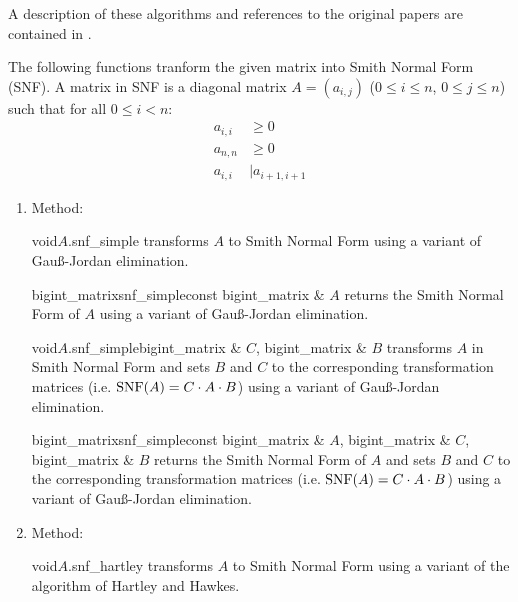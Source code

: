 {A description of these algorithms and references to the original papers are
contained in \cite{Theobald:2000}.



The following functions tranform the given matrix into Smith Normal Form (SNF).  A matrix in SNF
is a diagonal matrix $A = (a_{i,j})$ ($0 \leq i \leq n$, $0 \leq j \leq n$) such that for all $0
\leq i < n$:
\begin{align*}
  a_{i,i} & \geq 0 \\
  a_{n,n} & \geq 0 \\
  a_{i,i} & \mid a_{i+1,i+1}
\end{align*}
\begin{enumerate}
\item Method:

  \begin{fcode}{void}{$A$.snf_simple}{}
    transforms $A$ to Smith Normal Form using a variant of Gau\ss-Jordan elimination.
  \end{fcode}

  \begin{fcode}{bigint_matrix}{snf_simple}{const bigint_matrix & $A$}
    returns the Smith Normal Form of $A$ using a variant of Gau\ss-Jordan elimination.
  \end{fcode}

  \begin{fcode}{void}{$A$.snf_simple}{bigint_matrix & $C$, bigint_matrix & $B$}
    transforms $A$ in Smith Normal Form and sets $B$ and $C$ to the corresponding transformation
    matrices (i.e. $\operatorname{SNF}(A) = C \cdot A \cdot B$) using a variant of Gau\ss-Jordan elimination.
  \end{fcode}

  \begin{fcode}{bigint_matrix}{snf_simple}{const bigint_matrix & $A$, bigint_matrix & $C$, bigint_matrix & $B$}
    returns the Smith Normal Form of $A$ and sets $B$ and $C$ to the corresponding
    transformation matrices (i.e. $\operatorname{SNF}(A) = C \cdot A \cdot B$) using a variant of
    Gau\ss-Jordan elimination.
  \end{fcode}

\item Method:

  \begin{fcode}{void}{$A$.snf_hartley}{}
    transforms $A$ to Smith Normal Form using a variant of the algorithm of Hartley and Hawkes.
  \end{fcode}


\end{enumerate}}
